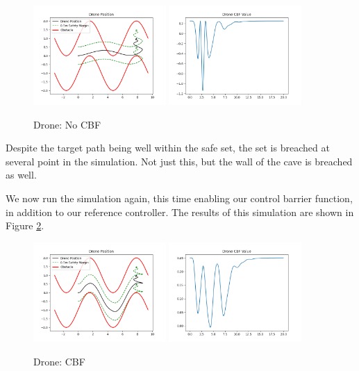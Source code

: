 \begin{figure}[H]
    \centering
    \includegraphics[width=0.45\textwidth]{Figures/Examples/Drone/DronePathNoCBF.png}
    \includegraphics[width=0.45\textwidth]{Figures/Examples/Drone/DroneNoCBFValue.png}
    \caption{Drone: No CBF}
    \label{fig:DronePathNoCBF}
\end{figure}

\noindent Despite the target path being well within the safe set, the set is breached at several point in the simulation. Not just this, but the wall of the cave is breached as well. \newline

\noindent We now run the simulation again, this time enabling our control barrier function, in addition to our reference controller. The results of this simulation are shown in Figure \ref{fig:DronePathCBF}.

\begin{figure}[H]
    \centering
    \includegraphics[width=0.45\textwidth]{Figures/Examples/Drone/DronePathCBF.png}
    \includegraphics[width=0.45\textwidth]{Figures/Examples/Drone/DroneCBFValue.png}
    \caption{Drone: CBF}
    \label{fig:DronePathCBF}
\end{figure}
